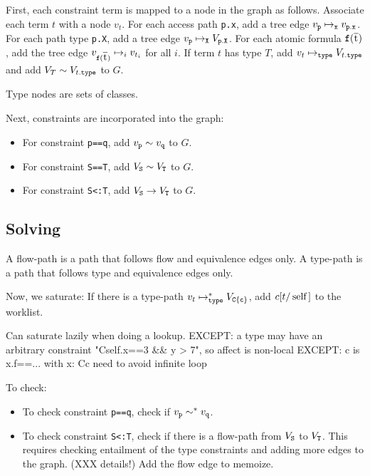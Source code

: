 \documentclass[preprint,nocopyrightspace,9pt]{sigplanconf}
\begin{document}
First, each constraint term is mapped to a node in the graph as
follows.
Associate each term $t$ with a node
$v_t$.  For each access path {\tt p.x}, add a tree edge
$v_{{\tt p}} \treeedge{{\tt x}} v_{{\tt p.x}}$.
For each path type {\tt p.X}, add a tree edge
$v_{{\tt p}} \treeedge{{\tt X}} V_{{\tt p.X}}$.
For each atomic formula ${\tt f}(\xbar{t})$, add the tree edge
$v_{{\tt f}(\xbar{t})} \treeedge{i} v_{t_i}$ for all $i$.
If term $t$ has type $T$, add $v_t \typeedge V_{t{\tt .type}}$
and
add $V_T \eqedge V_{t{\tt .type}}$ to $G$.

Type nodes are sets of classes.

Next, constraints are incorporated into the graph:

\begin{itemize}
\item
For constraint {\tt p==q}, add $v_{\tt p} \eqedge v_{\tt q}$ to $G$.

\item
For constraint {\tt S==T}, add $V_{\tt S} \eqedge V_{\tt T}$ to $G$.

\item
For constraint {\tt S<:T},
add $V_{\tt S} \flowedge V_{\tt T}$
to $G$.

\end{itemize}

\subsection{Solving}

A flow-path is a path that follows flow and equivalence edges
only.
A type-path is a path that follows type and equivalence edges
only.

Now, we saturate: 
If there is a type-path $v_t \typeedge^* V_{\tt C\{c\}}$,
add $c[t/\Xcd{self}]$ to the worklist.

        Can saturate lazily when doing a lookup.
        EXCEPT: a type may have an arbitrary constraint
                \xcd"C{self.x==3 && y > 7}", so affect is non-local
        EXCEPT: c is x.f==...
                with x: C{c}
                need to avoid infinite loop

To check:

\begin{itemize}
\item To check
constraint {\tt p==q}, check if $v_{\tt p} \eqedge^* v_{\tt q}$.
\item To check
constraint {\tt S<:T}, check if there is a flow-path from $V_{\tt S}$ to
$V_{\tt T}$.  This requires checking entailment of the type constraints and
adding more edges to the graph.  (XXX details!)
Add the flow edge to memoize.
\end{itemize}
\end{document}
